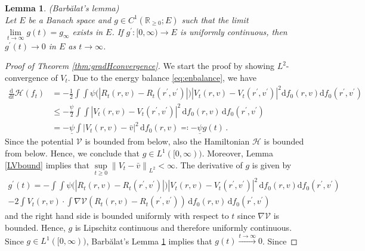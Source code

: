 \documentclass[11pt]{article}
\newtheorem{lemma}[theorem]{Lemma}
\newcommand{\R}[0]{\mathbb R}
\newcommand{\calH}[0]{\mathcal H}
\newcommand{\dx}[1]{\frac{\mathrm{d}}{\mathrm{d}#1}}
\newcommand{\norm}[1]{\left\| #1 \right\|}
\newcommand{\abs}[1]{\left| #1 \right|}
\newcommand{\msolinit}[1]{f_0(#1)}
\newcommand{\charX}[2]{R_{#1}(#2) }
\newcommand{\charV}[2]{V_{#1}(#2)}
\begin{document}
\begin{bibunit}[unsrtnat]
\begin{lemma}({B}arb\u alat's lemma) \label{Lbarbalat}\\  
    Let $E$ be a Banach space and $g \in C^{1}(\R_{\geq 0}; E)$ such that the limit $\lim\limits_{t \to \infty} g(t) = g_\infty$ exists in $E$. If $g^\prime \colon [0,\infty) \to E$ is uniformly continuous, then $ g^\prime (t) \to  0 $ in $E$ as $t \to \infty$.
    \end{lemma}
    
\begin{proof}[Proof of Theorem \ref{thm:gradHconvergence}]
    We start the proof by showing $L^2$-convergence of $V_t$. Due to the energy balance \eqref{eq:enbalance}, we have 
        \begin{align*}
            \dx{t} \calH (f_t) &= - \frac{1}{2} \int \int \psi \big( \abs{\charX{t}{r,v} - \charX{t}{r^\prime, v^\prime} } \big) \abs{ \charV{t}{r,v} - \charV{t}{r^\prime, v^\prime} }^{2} \mathrm{d} \msolinit{r,v} \mathrm{d} \msolinit{r^\prime, v^\prime} \\
            &\leq - \frac{\underline{\psi}}{2} \int \int \abs{ \charV{t}{r,v} - \charV{t}{r^\prime, v^\prime}  }^{2} \, \mathrm{d} \msolinit{r,v} \, \mathrm{d}\msolinit{r^\prime, v^\prime} \\
            &= - \underline{\psi} \int \abs{ \charV{t}{r,v} - \bar{v}}^{2} \, \mathrm{d}\msolinit{r,v} \eqcolon - \underline{\psi} g(t)\, . 
        \end{align*}
        Since the potential $\mathcal{V}$ is bounded from below, also the Hamiltonian $\calH$ is bounded from below. Hence, we conclude that $g \in L^{1}([0,\infty))$. Moreover, Lemma \ref{LVbound} implies that $\sup\limits_{t \geq 0} \norm{V_t -\bar{v}}_{L^2} < \infty$. The derivative of $g$ is given by 
        \begin{align*}
            g^\prime(t) = - \int \int \psi \big(\abs{ \charX{t}{r,v} - \charX{t}{r^\prime, v^\prime} }\big) \abs{ \charV{t}{r,v} - \charV{t}{r^\prime, v^\prime} }^2 \, \mathrm{d} \msolinit{r,v} \mathrm{d} \msolinit{r^\prime, v^\prime} \\
            - 2 \int \charV{t}{r,v} \cdot \int \nabla \mathcal{V} (\charX{t}{r,v} - \charX{t}{r^\prime, v^\prime}) \, \mathrm{d} \msolinit{r,v} \, \mathrm{d} \msolinit{r^\prime, v^\prime}  
        \end{align*}
        and the right hand side is bounded uniformly with respect to $t$ since $\nabla \mathcal{V}$ is bounded. Hence, $g$ is Lipschitz continuous and therefore uniformly continuous. Since $g \in L^1([0,\infty))$, {B}arb\u alat's Lemma \ref{Lbarbalat} implies that $g(t) \stackrel{t \to \infty}{\to} 0$. Since

\end{proof}
\end{bibunit}
\end{document}
